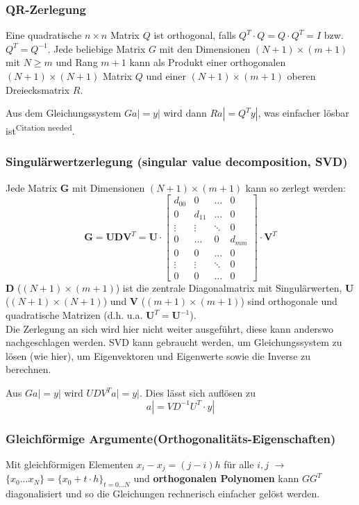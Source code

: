 \subsubsection{QR-Zerlegung}
Eine quadratische $n \times n$ Matrix $Q$ ist orthogonal, falls $Q^T \cdot Q = Q \cdot Q^T = I$ bzw. $Q^T = Q^{-1}$.
Jede beliebige Matrix $G$ mit den Dimensionen $(N+1) \times (m+1)$ mit $N \geq m$ und Rang $m+1$ kann als
Produkt einer orthogonalen $(N+1)\times(N+1)$ Matrix $Q$ und einer $(N+1)\times(m+1)$ oberen Dreiecksmatrix $R$.

Aus dem Gleichungssystem $Ga| = y|$ wird dann $Ra|=Q^Ty|$, was einfacher lösbar ist\textsuperscript{Citation needed}.

\subsubsection{Singulärwertzerlegung (singular value decomposition, SVD)}
Jede Matrix $\bm G$ mit Dimensionen $(N+1) \times (m+1)$ kann so zerlegt werden:
$$\bm G = \bm U \bm D \bm V^T = \bm U \cdot \begin{bmatrix}
  d_{00} & 0      & \ldots & 0\\
  0      & d_{11} & \ldots & 0\\
  \vdots & \vdots & \ddots & 0\\
  0      & \ldots & 0      & d_{mm}\\
  0      & 0      & \ldots & 0\\
  \vdots & \vdots & \ddots & 0\\
  0      & 0      & \ldots & 0
\end{bmatrix} \cdot \bm V^T$$
$\bm D$ ($(N+1) \times (m+1)$) ist die zentrale Diagonalmatrix mit Singulärwerten,
$\bm U$ ($(N+1) \times (N+1)$) und $\bm V$ ($(m+1) \times (m+1)$) sind orthogonale und quadratische
Matrizen (d.h. u.a. $\bm U^T=\bm U^{-1}$).\\

Die Zerlegung an sich wird hier nicht weiter ausgeführt, diese kann anderswo nachgeschlagen werden.
SVD kann gebraucht werden, um Gleichungssystem zu lösen (wie hier), um Eigenvektoren und Eigenwerte 
sowie die Inverse zu berechnen.

Aus $Ga|=y|$ wird $UDV^T a|=y|$. Dies lässt sich auflösen zu
\[
    a| = V D^{-1}U^T \cdot y|
\]

\subsubsection{Gleichförmige Argumente\quad (Orthogonalitäts-Eigenschaften)} \label{sssec:ls_orthogonal}
Mit gleichförmigen Elementen $x_i - x_j = (j-i) h$ für alle $i,j$ $\rightarrow$ $\{x_0...x_N\} = \{x_0 + t \cdot h\}_{t=0...N}$ und \textbf{orthogonalen Polynomen} kann 
$G G^T$ diagonalisiert und so die Gleichungen rechnerisch einfacher gelöst werden. 

